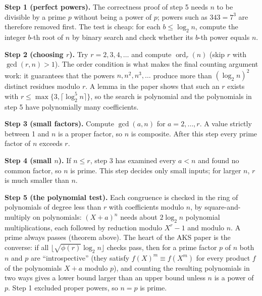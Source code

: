 \textbf{Step 1 (perfect powers).} The correctness proof of step 5 needs $n$ to be divisible by a prime $p$ without being a power of $p$; powers such as $343 = 7^3$ are therefore removed first. The test is cheap: for each $b \le \log_2 n$, compute the integer $b$-th root of $n$ by binary search and check whether its $b$-th power equals $n$.

\textbf{Step 2 (choosing $r$).} Try $r = 2, 3, 4, \dots$ and compute $\operatorname{ord}_r(n)$ (skip $r$ with $\gcd(r, n) > 1$). The order condition is what makes the final counting argument work: it guarantees that the powers $n, n^2, n^3, \dots$ produce more than $(\log_2 n)^2$ distinct residues modulo $r$. A lemma in the paper shows that such an $r$ exists with $r \le \max\{3, \lceil \log_2^5 n\rceil\}$, so the search is polynomial and the polynomials in step 5 have polynomially many coefficients.

\textbf{Step 3 (small factors).} Compute $\gcd(a, n)$ for $a = 2, \dots, r$. A value strictly between 1 and $n$ is a proper factor, so $n$ is composite. After this step every prime factor of $n$ exceeds $r$.

\textbf{Step 4 (small $n$).} If $n \le r$, step 3 has examined every $a < n$ and found no common factor, so $n$ is prime. This step decides only small inputs; for larger $n$, $r$ is much smaller than $n$.

\textbf{Step 5 (the polynomial test).} Each congruence is checked in the ring of polynomials of degree less than $r$ with coefficients modulo $n$, by square-and-multiply on polynomials: $(X + a)^n$ needs about $2\log_2 n$ polynomial multiplications, each followed by reduction modulo $X^r - 1$ and modulo $n$. A prime always passes (theorem above). The heart of the AKS paper is the converse: if all $\lfloor\sqrt{\phi(r)}\log_2 n\rfloor$ checks pass, then for a prime factor $p$ of $n$ both $n$ and $p$ are ``introspective'' (they satisfy $f(X)^m \equiv f(X^m)$ for every product $f$ of the polynomials $X + a$ modulo $p$), and counting the resulting polynomials in two ways gives a lower bound larger than an upper bound unless $n$ is a power of $p$. Step 1 excluded proper powers, so $n = p$ is prime.


